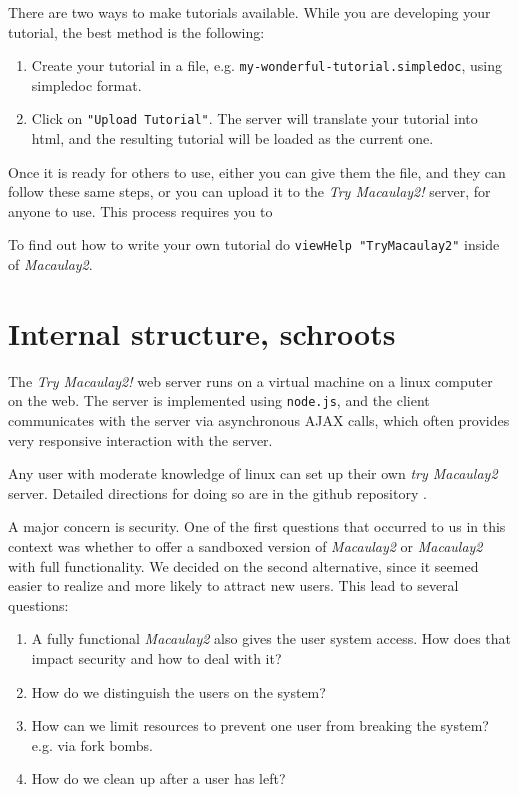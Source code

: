\documentclass[]{article}
\def\tryM2{{\it Try Macaulay2!}}
\def\M2{{\it Macaulay2}}
\begin{document}
There are two ways to make tutorials available.  While you are developing your tutorial, the 
best method is the following:
\begin{enumerate}
\item Create your tutorial in a file, e.g. {\tt my-wonderful-tutorial.simpledoc}, using
simpledoc format.  
\item Click on {\tt "Upload Tutorial"}.  The server will translate your tutorial into html, and 
the resulting tutorial will be loaded as the current one.
\end{enumerate}

Once it is ready for others to use, either you can give them the file, and they can follow these same steps,
or you can upload it to the \tryM2 server, for anyone to use.  This process requires you to 

To find out how to write your own tutorial do {\tt viewHelp "TryMacaulay2"} inside of \M2.

\section{Internal structure, schroots}

The \tryM2 web server runs on a virtual machine on a linux computer on the web.
The server is implemented using {\tt node.js}, and the client
communicates with the server via asynchronous AJAX calls, which often
provides very responsive interaction with the server.

Any user with moderate knowledge of linux can set up their own {\it try Macaulay2}
server.  Detailed directions for doing so are in the github repository \cite{github}.

A major concern is security.
One of the first questions that occurred to us in this context was
whether to offer a sandboxed version of \M2 or \M2 with full
functionality.
We decided on the second alternative, since it seemed
easier to realize and more likely to attract new users.  This lead to
several questions:

\begin{enumerate}
\item A fully functional \M2 also gives the user system access. How does that impact security and how to deal with it?
\item How do we distinguish the users on the system?
\item How can we limit resources to prevent one user from breaking the system? e.g. via fork bombs.
\item How do we clean up after a user has left?
\end{enumerate}
\end{document}
